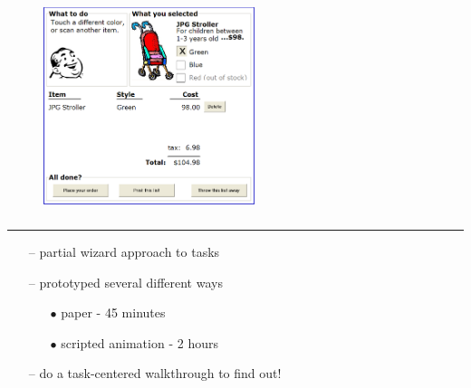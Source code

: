 \documentclass[pdf]{beamer}
\begin{document}
{%
\begin{frame}
\begin{figure}
\vspace{27mm}
    \includegraphics[width=0.55\textwidth]{31_Prototype.png} 
\end{figure}
\frametitle{\textcolor{myBlue}{\textbf{\hspace{8mm}{Are there better ways to do it?}}} }
\vspace*{-6mm}
\textcolor{red}{\rule{10cm}{1mm}} \par
\vspace{5mm}
\textcolor{myBlue}{\hspace{2mm}{A task-centered prototype}}
\begin{itemize}
	\item[\textcolor{myBlue}{--}] \textcolor{myBlue}{{\small partial wizard approach to tasks}}
    \item[\textcolor{myBlue}{--}] \textcolor{myBlue}{{\small prototyped several different ways}}
		\begin{itemize}
			\item[\textcolor{myBlue}{$\bullet$}]\textcolor{myBlue}{{\scriptsize paper - 45 minutes }}
         	\item[\textcolor{myBlue}{$\bullet$}]\textcolor{myBlue}{{\scriptsize scripted animation - 2 hours }}
		\end{itemize}    
\end{itemize}
	\vspace{25mm} 
\textcolor{myBlue}{\hspace{2mm}{Does it work?}}
\begin{itemize}
	\item[\textcolor{myBlue}{--}] \textcolor{myBlue}{{\small do a task-centered walkthrough to find out!}}
\end{itemize}
\end{frame}}
\end{document}
